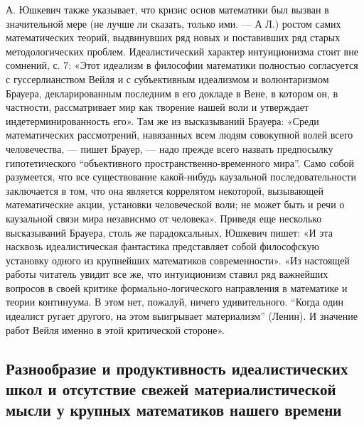 А. Юшкевич  также указывает,  что кризис  основ математики  был вызван
в  значительной  мере  (не  лучше   ли  сказать,  только  ими.  ---  А
Л.)  ростом  самих  математических  теорий, выдвинувших  ряд  новых  и
поставивших  ряд  старых   методологических  проблем.  Идеалистический
характер  интуиционизма  стоит  вне  сомнений, с.  7:  «Этот  идеализм
в  философии   математики  полностью  согласуется   с  гуссерлианством
Вейля   и  с   субъективным   идеализмом   и  волюнтаризмом   Брауера,
декларированным  последним в  его  докладе  в Вене,  в  котором он,  в
частности,  рассматривает мир  как  творение нашей  воли и  утверждает
индетерминированность  его». Там  же из  высказываний Брауера:  «Среди
математических  рассмотрений, навязанных  всем людям  совокупной волей
всего человечества,  --- пишет Брауер,  --- надо прежде  всего назвать
предпосылку гипотетического  ``объективного пространственно-временного
мира''.  Само собой  разумеется,  что  все существование  какой-нибудь
каузальной  последовательности заключается  в  том,  что она  является
коррелятом  некоторой,  вызывающей   математические  акции,  установки
человеческой  воли;   не  может  быть   и  речи  о   каузальной  связи
мира  независимо  от  человека». Приведя  еще  несколько  высказываний
Брауера,  столь  же парадоксальных,  Юшкевич  пишет:  «И эта  насквозь
идеалистическая  фантастика представляет  собой философскую  установку
одного из крупнейших математиков  современности». «Из настоящей работы
читатель увидит все же, что интуиционизм ставил ряд важнейших вопросов
в  своей  критике  формально-логического направления  в  математике  и
теории континуума. В этом  нет, пожалуй, ничего удивительного. ``Когда
один  идеалист  ругает  другого,   на  этом  выигрывает  материализм''
(Ленин). И значение работ Вейля именно в этой критической стороне».

\subsection{Разнообразие  и  продуктивность   идеалистических  школ  и
отсутствие  свежей  материалистической  мысли  у  крупных  математиков
нашего времени}

